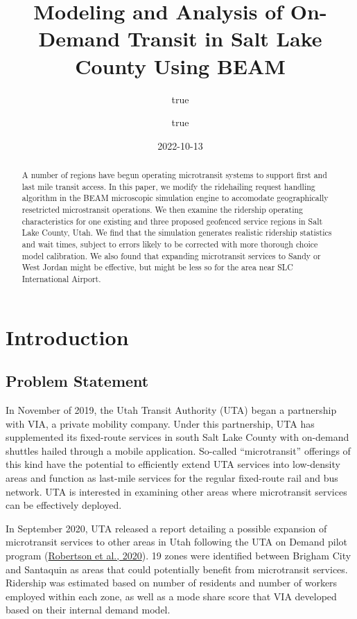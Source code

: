 \documentclass[
]{article}
\title{Modeling and Analysis of On-Demand Transit in Salt Lake County Using BEAM}
\author{true \and true}
\date{2022-10-13}
\begin{document}
\maketitle
\begin{abstract}
A number of regions have begun operating microtransit systems to support first and last mile transit access. In this paper, we modify the ridehailing request handling algorithm in the BEAM microscopic simulation engine to accomodate geographically resetricted microstransit operations. We then examine the ridership operating characteristics for one existing and three proposed geofenced service regions in Salt Lake County, Utah. We find that the simulation generates realistic ridership statistics and wait times, subject to errors likely to be corrected with more thorough choice model calibration. We also found that expanding microtransit services to Sandy or West Jordan might be effective, but might be less so for the area near SLC International Airport.
\end{abstract}

{
\setcounter{tocdepth}{2}
\tableofcontents
}
\hypertarget{introduction}{%
\section{Introduction}\label{introduction}}

\hypertarget{problem-statement}{%
\subsection{Problem Statement}\label{problem-statement}}

In November of 2019, the Utah Transit Authority (UTA) began a partnership with VIA, a private mobility company. Under this partnership, UTA has supplemented its fixed-route services in south Salt Lake County with on-demand shuttles hailed through a mobile application. So-called ``microtransit'' offerings of this kind have the potential to efficiently extend UTA services into low-density areas and function as last-mile services for the regular fixed-route rail and bus network. UTA is interested in examining other areas where microtransit services can be effectively deployed.

In September 2020, UTA released a report detailing a possible expansion of microtransit services to other areas in Utah following the UTA on Demand pilot program (\protect\hyperlink{ref-UTAreport}{Robertson et al., 2020}). 19 zones were identified between Brigham City and Santaquin as areas that could potentially benefit from microtransit services. Ridership was estimated based on number of residents and number of workers employed within each zone, as well as a mode share score that VIA developed based on their internal demand model.
\end{document}

